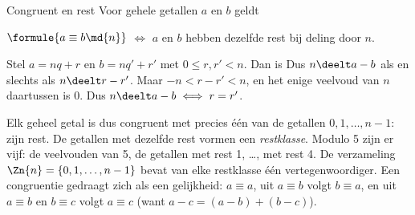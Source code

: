 \begin{theorie}
\begin{stelling}{Congruent en rest}
Voor gehele getallen $a$ en $b$ geldt

\vspace{1mm}
\qquad $\formule{a \equiv b \md{n}}$ \quad $\iff$ \quad $a$ en $b$ hebben dezelfde rest bij deling door $n$.
\end{stelling}

\begin{bewijs}
Stel $a = nq + r$ en $b = nq' + r'$ met $0 \leqslant r, r' < n$. Dan is
Dus $n \deelt a - b$ als en slechts als $n \deelt r - r'$. Maar $-n < r - r' < n$, en het enige veelvoud van $n$ daartussen is 0. Dus $n \deelt a - b \iff r = r'$.
\end{bewijs}
\end{theorie}

Elk geheel getal is dus congruent met precies één van de getallen $0, 1, \ldots, n - 1$: zijn rest. De getallen met dezelfde rest vormen een \emph{restklasse}. Modulo 5 zijn er vijf: de veelvouden van 5, de getallen met rest 1, \ldots, met rest 4. De verzameling $\Zn{n} = \{0, 1, \ldots, n - 1\}$ bevat van elke restklasse één vertegenwoordiger. Een congruentie gedraagt zich als een gelijkheid: $a \equiv a$, uit $a \equiv b$ volgt $b \equiv a$, en uit $a \equiv b$ en $b \equiv c$ volgt $a \equiv c$ (want $a - c = (a - b) + (b - c)$).



\begin{oefeningen}
\end{oefeningen}

